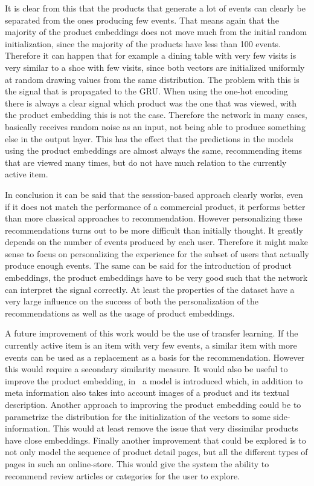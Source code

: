 It is clear from this that the products that generate a lot of events can clearly be separated from the ones producing few events.
That means again that the majority of the product embeddings does not move much from the initial random initialization, since the majority of the products have less than 100 events.
Therefore it can happen that for example a dining table with very few visits is very similar to a shoe with few visits, since both vectors are initialized uniformly at random drawing values from the same distribution.
The problem with this is the signal that is propagated to the GRU.
When using the one-hot encoding there is always a clear signal which product was the one that was viewed, with the product embedding this is not the case.
Therefore the network in many cases, basically receives random noise as an input, not being able to produce something else in the output layer.
This has the effect that the predictions in the models using the product embeddings are almost always the same, recommending items that are viewed many times, but do not have much relation to the currently active item.
\par
In conclusion it can be said that the sesssion-based approach clearly works, even if it does not match the performance of a commercial product, it performs better than more classical approaches to recommendation.
However personalizing these recommendations turns out to be more difficult than initially thought.
It greatly depends on the number of events produced by each user.
Therefore it might make sense to focus on personalizing the experience for the subset of users that actually produce enough events.
The same can be said for the introduction of product embeddings, the product embeddings have to be very good such that the network can interpret the signal correctly.
At least the properties of the dataset have a very large influence on the success of both the personalization of the recommendations as well as the usage of product embeddings.
\par
A future improvement of this work would be the use of transfer learning.
If the currently active item is an item with very few events, a similar item with more events can be used as a replacement as a basis for the recommendation.
However this would require a secondary similarity measure.
It would also be useful to improve the product embedding, in~\cite{content2vec} a model is introduced which, in addition to meta information also takes into account images of a product and its textual description.
Another approach to improving the product embedding could be to parametrize the distribution for the initialization of the vectors to some side-information.
This would at least remove the issue that very dissimilar products have close embeddings.
Finally another improvement that could be explored is to not only model the sequence of product detail pages, but all the different types of pages in such an online-store.
This would give the system the ability to recommend review articles or categories for the user to explore.